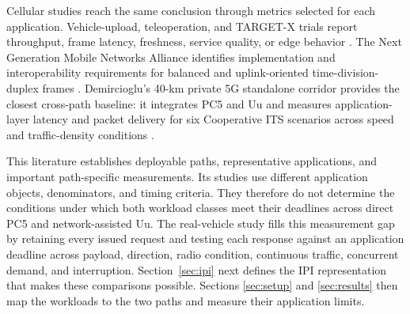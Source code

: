 Cellular studies reach the same conclusion through metrics selected for each
application. Vehicle-upload, teleoperation, and TARGET-X trials report
throughput, frame latency, freshness, service quality, or edge behavior
\cite{carpenter2023multimodal,kakkavas2022teso,fezeu2025teleoperating,
nasreddine2026targetx}. The Next Generation Mobile Networks Alliance identifies
implementation and interoperability requirements for balanced and
uplink-oriented time-division-duplex frames \cite{ngmn2021tdd}. Demircioglu's
40-km private 5G standalone corridor provides the closest cross-path baseline:
it integrates PC5 and Uu and measures application-layer latency and packet
delivery for six Cooperative ITS scenarios across speed and traffic-density
conditions \cite{demircioglu2026corridor}.

This literature establishes deployable paths, representative applications, and
important path-specific measurements. Its studies use different application
objects, denominators, and timing criteria. They therefore do not determine the
conditions under which both workload classes meet their deadlines across direct
PC5 and network-assisted Uu. The real-vehicle study fills this measurement gap
by retaining every issued request and testing each response against an
application deadline across payload, direction, radio condition, continuous
traffic, concurrent demand, and interruption. Section~\ref{sec:ipi} next defines
the IPI representation that makes these comparisons possible. Sections
\ref{sec:setup} and \ref{sec:results} then map the workloads to the two paths and
measure their application limits.
